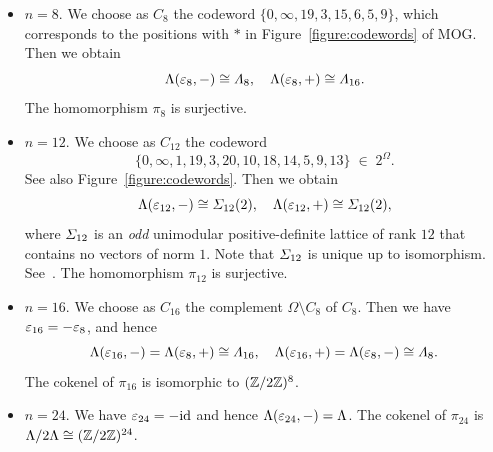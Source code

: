 \documentclass{amsart} %
\begin{document}
\begin{itemize}
%
\item $n=8$. 
We choose as $C_{8}$ the codeword 
$\{ 0,\infty, 19, 3, 15, 6, 5, 9\} $, 
which corresponds to 
the positions with $*$ in Figure~\ref{figure:codewords} of MOG.
Then  we obtain 
\[
\Lambda(\varepsilon_8, -)\cong \varLambda_{8},
\quad 
\Lambda(\varepsilon_8, +)\cong \varLambda_{16}.
\]
The homomorphism $\pi_{8}$ is surjective.
%
\item $n=12$. 
We choose as $C_{12}$ the codeword 
\begin{equation}\label{eq:C12}
\{ 0,\infty, 1,19, 3, 20,10, 18, 14,   5, 9, 13\} \;\in\; 2^{\Omega}.
\end{equation}
See also Figure~\ref{figure:codewords}.
Then  we obtain 
\[
\Lambda(\varepsilon_{12}, -)\cong \varSigma_{12}(2),
\quad 
\Lambda(\varepsilon_{12}, +)\cong \varSigma_{12}(2),
\]
where $\varSigma_{12}$ is an \emph{odd}  unimodular positive-definite lattice of rank $12$
that contains no vectors of norm $1$.
Note that $\varSigma_{12}$ is unique up to isomorphism.
See~\cite[Table 16.7]{theCSbook}.
The homomorphism  $\pi_{12}$ is surjective.
%
\item $n=16$. 
We choose as $C_{16}$ the complement $\Omega\setminus C_8$ of $C_8$. 
Then  we have $\varepsilon_{16}=-\varepsilon_{8}$, and hence 
\[
\Lambda(\varepsilon_{16}, -)=\Lambda(\varepsilon_{8}, +)\cong \varLambda_{16},
\quad 
\Lambda(\varepsilon_{16}, +)=\Lambda(\varepsilon_8, -)\cong \varLambda_{8}.
\]
%
The cokenel  of   $\pi_{16}$ is isomorphic to $(\mathord{\mathbb{Z}}/2\mathord{\mathbb{Z}})^8$.
%
\item $n=24$. We have $\varepsilon_{24}=-\mathord{\mathrm{id}}$ and hence 
$\Lambda(\varepsilon_{24}, -)=\Lambda$.
The cokenel  of   $\pi_{24}$ is $\Lambda/2\Lambda \cong (\mathord{\mathbb{Z}}/2\mathord{\mathbb{Z}})^{24}$.
\end{itemize}
%
\end{document}
